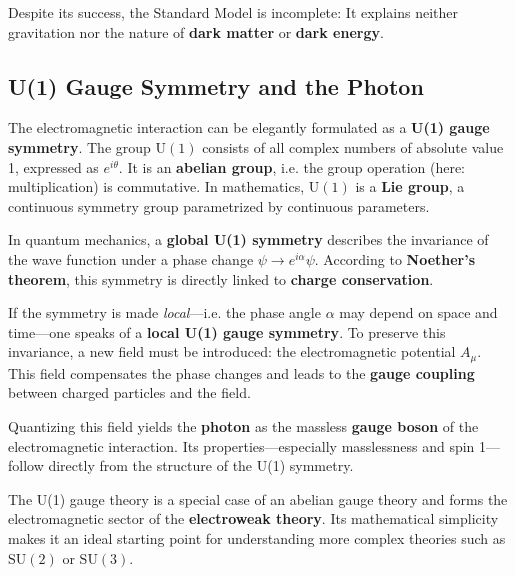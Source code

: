 Despite its success, the Standard Model is incomplete:  
It explains neither gravitation nor the nature of \textbf{dark matter} or \textbf{dark energy}.

\subsection{U(1) Gauge Symmetry and the Photon}

The electromagnetic interaction can be elegantly formulated as a \textbf{U(1) gauge symmetry}.  
The group \(\mathrm{U(1)}\) consists of all complex numbers of absolute value 1, expressed as \(e^{i\theta}\).  
It is an \textbf{abelian group}, i.e. the group operation (here: multiplication) is commutative.  
In mathematics, \(\mathrm{U(1)}\) is a \textbf{Lie group}, a continuous symmetry group parametrized by continuous parameters.

In quantum mechanics, a \textbf{global U(1) symmetry} describes the invariance of the wave function under a phase change \(\psi \to e^{i\alpha}\psi\).  
According to \textbf{Noether’s theorem}, this symmetry is directly linked to \textbf{charge conservation}.

If the symmetry is made \emph{local}—i.e. the phase angle \(\alpha\) may depend on space and time—one speaks of a \textbf{local U(1) gauge symmetry}.  
To preserve this invariance, a new field must be introduced: the electromagnetic potential \(A_\mu\).  
This field compensates the phase changes and leads to the \textbf{gauge coupling} between charged particles and the field.

Quantizing this field yields the \textbf{photon} as the massless \textbf{gauge boson} of the electromagnetic interaction.  
Its properties—especially masslessness and spin 1—follow directly from the structure of the U(1) symmetry.

The U(1) gauge theory is a special case of an abelian gauge theory and forms the electromagnetic sector of the \textbf{electroweak theory}.  
Its mathematical simplicity makes it an ideal starting point for understanding more complex theories such as \(\mathrm{SU(2)}\) or \(\mathrm{SU(3)}\).

